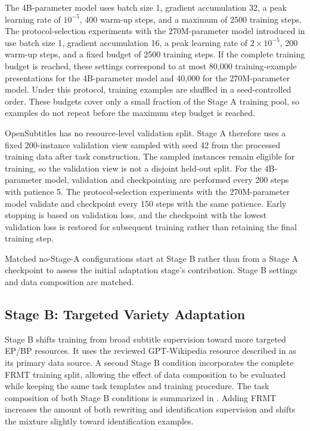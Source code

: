 The 4B-parameter model uses batch size 1, gradient accumulation 32, a peak
learning rate of \(10^{-5}\), 400 warm-up steps, and a maximum of 2500 training
steps. The protocol-selection experiments with the 270M-parameter model introduced in
 use batch size 1, gradient accumulation 16, a peak
learning rate of \(2\times10^{-5}\), 200 warm-up steps, and a fixed budget of
2500 training steps. If the complete training budget is reached, these settings
correspond to at most 80,000 training-example presentations for the 4B-parameter
model and 40,000 for the 270M-parameter model. Under this protocol, training
examples are shuffled in a seed-controlled order. These budgets cover
only a small fraction of the Stage A training pool, so examples do not repeat
before the maximum step budget is reached.

OpenSubtitles has no resource-level validation split. Stage A therefore uses a
fixed 200-instance validation view sampled with seed 42 from the processed
training data after task construction. The sampled instances remain eligible for
training, so the validation view is not a disjoint held-out split. For the
4B-parameter model, validation and checkpointing are performed every
200 steps with patience 5. The protocol-selection experiments with the 270M-parameter model validate and
checkpoint every 150 steps with the same patience. Early stopping
is based on validation loss, and the checkpoint with the lowest validation loss
is restored for subsequent training rather than retaining the final training
step.

Matched no-Stage-A configurations start at Stage B rather than from a Stage A
checkpoint to assess the initial adaptation stage's contribution. Stage B
settings and data composition are matched.

\subsection{Stage B: Targeted Variety Adaptation}
\label{sec:method-stage-b}

Stage B shifts training from broad subtitle supervision toward more targeted
EP/BP resources. It uses the reviewed GPT-Wikipedia resource described in
 as its primary data source. A second Stage B
condition incorporates the complete FRMT training split, allowing the effect
of data composition to be evaluated while keeping the same task templates and
training procedure. The task composition of both Stage B conditions is
summarized in . Adding FRMT increases the
amount of both rewriting and identification supervision and shifts the mixture
slightly toward identification examples.

